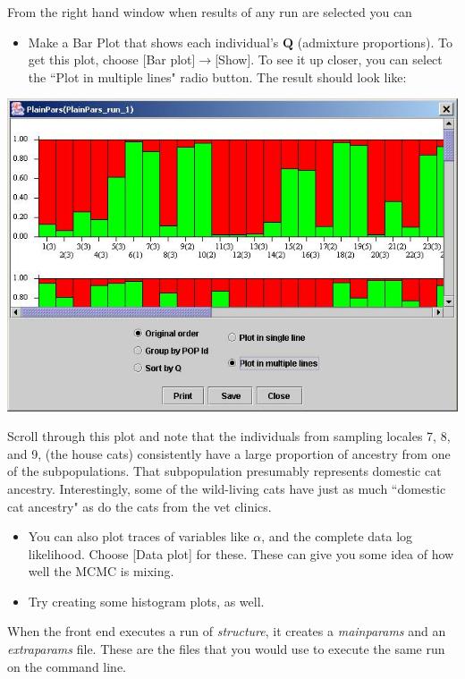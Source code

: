 From the right hand window when results of any run are selected you can 
\begin{itemize}
\item Make a Bar Plot that shows each individual's $\bm{Q}$ (admixture proportions).  To get this plot, choose [Bar plot]$\rightarrow$[Show].  To see it up closer, you can select the ``Plot in multiple lines" radio button.  The result should look like:
\end{itemize}
\begin{center}
\includegraphics[width=.66\textwidth]{illus/barplot.jpg}
\end{center}
Scroll through this plot and note that the individuals from sampling locales 7, 8, and 9, (the house cats) consistently have a large proportion of ancestry from one of the subpopulations.  That subpopulation presumably represents domestic cat ancestry.  Interestingly, some of the wild-living cats have just as much ``domestic cat ancestry" as do the cats from the vet clinics.  

\begin{itemize}
\item You can also plot traces of variables like $\alpha$, and the complete data log likelihood.  Choose [Data plot] for these.  These can give you some idea of how well the MCMC is mixing.  
\item Try creating some histogram plots, as well.  
\end{itemize}

When the front end executes a run of {\em structure}, it creates a {\sl mainparams} and an {\sl extraparams} file.  These are the files that you would use to execute the same run on the command line.  

